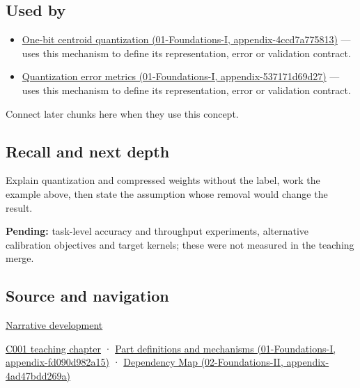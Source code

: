 \subsection{Used by}\label{appendix-fdc7879e8bf2-used-by}

\begin{itemize}
\tightlist
\item
  \href{../01-Foundations-I/main.pdf\#nameddest=appendix-4ccd7a775813}{One-bit centroid quantization (01-Foundations-I, appendix-4ccd7a775813)} --- uses this mechanism to define its representation, error or validation contract.
\item
  \href{../01-Foundations-I/main.pdf\#nameddest=appendix-537171d69d27}{Quantization error metrics (01-Foundations-I, appendix-537171d69d27)} --- uses this mechanism to define its representation, error or validation contract.
\end{itemize}

Connect later chunks here when they use this concept.

\subsection{Recall and next depth}\label{appendix-fdc7879e8bf2-recall-and-next-depth}

Explain quantization and compressed weights without the label, work the example above, then state the assumption whose removal would change the result.

\textbf{Pending:} task-level accuracy and throughput experiments, alternative calibration objectives and target kernels; these were not measured in the teaching merge.

\subsection{Source and navigation}\label{appendix-fdc7879e8bf2-source-and-navigation}

\href{Continuous\%20Notes/Computing\%20Foundations\%20-\%20From\%20Bits\%20to\%20C++\%20and\%20Systems\%20APIs\#Choosing\%20what\%20information\%20to\%20keep}{Narrative development}

\href{Continuous\%20Notes/Computing\%20Foundations\%20-\%20From\%20Bits\%20to\%20C++\%20and\%20Systems\%20APIs\#From\%20a\%20signal\%20to\%20an\%20interpretation}{C001 teaching chapter} · \href{../01-Foundations-I/main.pdf\#nameddest=appendix-fd090d982a15}{Part definitions and mechanisms (01-Foundations-I, appendix-fd090d982a15)} · \href{../02-Foundations-II/main.pdf\#nameddest=appendix-4ad47bdd269a}{Dependency Map (02-Foundations-II, appendix-4ad47bdd269a)}
